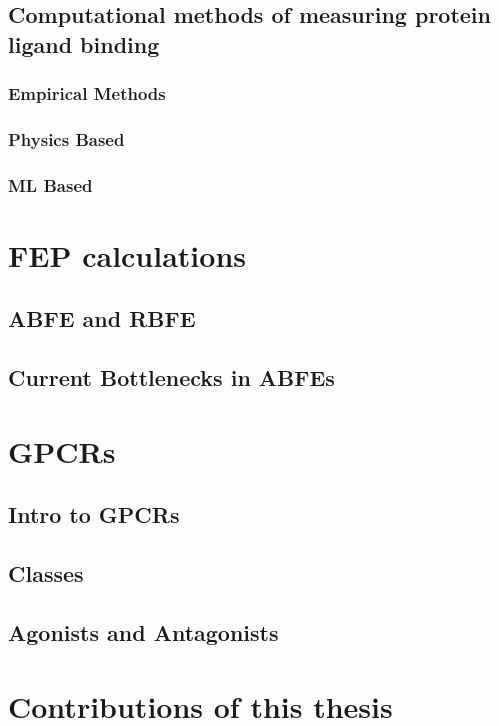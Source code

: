 \lipsum[1][1-3]

\subsection{Computational methods of measuring protein ligand binding}

\lipsum[1][1-3]

\subsubsection{Empirical Methods}

\lipsum[1][1-3]

\subsubsection{Physics Based}

\lipsum[1][1-3]

\subsubsection{ML Based}

\lipsum[1][1-3]

\section{FEP calculations} %

\lipsum[1][1-3]

\subsection{ABFE and RBFE}

\lipsum[1][1-3]

\subsection{Current Bottlenecks in ABFEs}

\lipsum[1][1-3]

\section{GPCRs}

\lipsum[1][1-3]

\subsection{Intro to GPCRs}

\lipsum[1][1-3]

\subsection{Classes}

\lipsum[1][1-3]

\subsection{Agonists and Antagonists}

\lipsum[1][1-3]

\section{Contributions of this thesis}

\lipsum[1][1-3]
